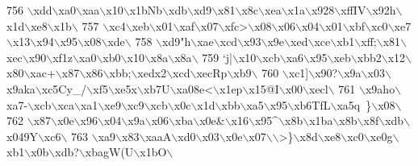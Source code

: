 \begin{DoxyCode}
{{756 \textcolor{stringliteral}{\(\backslash\)xdd\(\backslash\)xa0\(\backslash\)xaa\(\backslash\)x10\(\backslash\)x1bNb\(\backslash\)xdb\(\backslash\)xd9\(\backslash\)x81\(\backslash\)x8c\(\backslash\)xea\(\backslash\)x1a\(\backslash\)x928\(\backslash\)xffIV\(\backslash\)x92h\(\backslash\)x1d\(\backslash\)xe8\(\backslash\)x1b\(\backslash\)}
757 \textcolor{stringliteral}{\(\backslash\)xc4\(\backslash\)xeb\(\backslash\)x01\(\backslash\)xaf\(\backslash\)x07\(\backslash\)xfc>\(\backslash\)x08\(\backslash\)x06\(\backslash\)x04\(\backslash\)x01\(\backslash\)xbf\(\backslash\)xc0\(\backslash\)xe7\(\backslash\)x13\(\backslash\)x94\(\backslash\)x95\(\backslash\)x08\(\backslash\)xde\(\backslash\)}
758 \textcolor{stringliteral}{\(\backslash\)xd9"h\(\backslash\)xae\(\backslash\)xcd\(\backslash\)x93\(\backslash\)x9e\(\backslash\)xed\(\backslash\)xce\(\backslash\)xb1\(\backslash\)xff;\(\backslash\)x81\(\backslash\)xec\(\backslash\)x90\(\backslash\)xf1z\(\backslash\)xa0\(\backslash\)xb0\(\backslash\)x10\(\backslash\)x8a\(\backslash\)x8a\(\backslash\)}
759 \textcolor{stringliteral}{`j|\(\backslash\)x10\(\backslash\)xcb\(\backslash\)xa6\(\backslash\)x95\(\backslash\)xeb\(\backslash\)xbb2\(\backslash\)x12\(\backslash\)x80\(\backslash\)xac+\(\backslash\)x87\(\backslash\)x86\(\backslash\)xbb;\(\backslash\)xedx2\(\backslash\)xcd\(\backslash\)xecRp\(\backslash\)xb9\(\backslash\)}
760 \textcolor{stringliteral}{\(\backslash\)xc1]\(\backslash\)x90?\(\backslash\)x9a\(\backslash\)x03\(\backslash\)x9aka\(\backslash\)xc5Cy\_/\(\backslash\)xf5\(\backslash\)xe5x\(\backslash\)xb7U\(\backslash\)xa08e<\(\backslash\)x1ep\(\backslash\)x15@I\(\backslash\)x00\(\backslash\)xecl\(\backslash\)}
761 \textcolor{stringliteral}{\(\backslash\)x9aho\(\backslash\)xa7-\(\backslash\)xcb\(\backslash\)xca\(\backslash\)xa1\(\backslash\)xe9\(\backslash\)xc9\(\backslash\)xcb\(\backslash\)x0c\(\backslash\)x1d\(\backslash\)xbb\(\backslash\)xa5\(\backslash\)x95\(\backslash\)xb6TfL\(\backslash\)xa5q~\}\(\backslash\)x08\(\backslash\)}
762 \textcolor{stringliteral}{\(\backslash\)x87\(\backslash\)x0e\(\backslash\)x96\(\backslash\)x04\(\backslash\)x9a\(\backslash\)x06\(\backslash\)xba\(\backslash\)x0e&\(\backslash\)x16\(\backslash\)x95^\(\backslash\)x8b\(\backslash\)x1ba\(\backslash\)x8b\(\backslash\)x8f\(\backslash\)xdb\(\backslash\)x049Y\(\backslash\)xc6\(\backslash\)}
763 \textcolor{stringliteral}{\(\backslash\)xa9\(\backslash\)x83\(\backslash\)xaaA\(\backslash\)xd0\(\backslash\)x03\(\backslash\)x0e\(\backslash\)x07\(\backslash\)\(\backslash\)>\}\(\backslash\)x8d\(\backslash\)xe8\(\backslash\)xc0\(\backslash\)xe0g\(\backslash\)xb1\(\backslash\)x0b\(\backslash\)xdb?\(\backslash\)xbagW(U\(\backslash\)x1bO\(\backslash\)}
}}
\end{DoxyCode}
